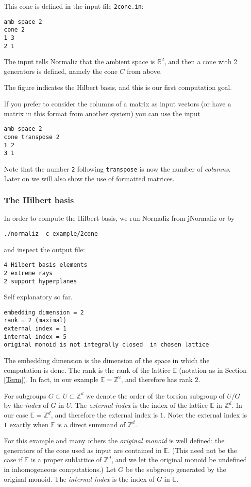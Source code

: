 \documentclass[12pt,a4paper]{scrartcl}
\theoremstyle{definition}
\def\ZZ{{\mathbb Z}}
\def\RR{{\mathbb R}}
\def\EE{{\mathbb E}}
\begin{document}
This cone is defined in the input file \verb|2cone.in|:
\begin{Verbatim}
amb_space 2
cone 2
1 3
2 1
\end{Verbatim}
The input tells Normaliz that the ambient space is $\RR^2$, and then a cone with 2 generators is defined, namely the cone $C$ from above.

The figure indicates the Hilbert basis, and this is our first computation goal.

If you prefer to consider the columns of a matrix as input vectors (or have a matrix in this format from another system) you can use the input
\begin{Verbatim}
amb_space 2
cone transpose 2
1 2
3 1
\end{Verbatim}
Note that the number \verb|2| following \verb|transpose| is now the number of \emph{columns}. Later on we will also show the use of formatted matrices.

\subsubsection{The Hilbert basis}
In order to compute the Hilbert basis, we run Normaliz from jNormaliz or by
\begin{Verbatim}
./normaliz -c example/2cone	
\end{Verbatim}
and inspect the output file:
\begin{Verbatim}
4 Hilbert basis elements
2 extreme rays
2 support hyperplanes
\end{Verbatim}
Self explanatory so far.
\begin{Verbatim}
embedding dimension = 2
rank = 2 (maximal)
external index = 1
internal index = 5
original monoid is not integrally closed  in chosen lattice
\end{Verbatim}
The embedding dimension is the dimension of the space in which the computation is done. The rank is the rank of the lattice $\EE$ (notation as in Section \ref{Term}). In fact, in our example $\EE=\ZZ^2$, and therefore has rank $2$.

For subgroups $G\subset U\subset \ZZ^d$ we denote the order of the torsion subgroup of $U/G$ by the \emph{index} of $G$ in $U$. The \emph{external index} is the index of the lattice $\EE$ in $\ZZ^d$. In our case $\EE=\ZZ^d$, and therefore the external index is $1$. Note: the external index is $1$ exactly when $\EE$ is a direct summand of $\ZZ^d$.

For this example and many others the \emph{original monoid} is well defined: the generators of the cone used as input are contained in $\EE$. (This need not be the case if $\EE$ is a proper sublattice of $\ZZ^d$, and we let the original monoid be undefined in inhomogeneous computations.) Let $G$ be the subgroup generated by the original monoid. The \emph{internal index} is the index of $G$ in $\EE$.
\end{document}
